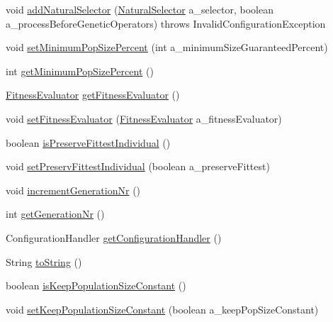 \begin{DoxyCompactItemize}
\item 
void \hyperlink{classorg_1_1jgap_1_1_configuration_af7e58c2226e9c3175f83c26fa7b9dd34}{add\-Natural\-Selector} (\hyperlink{classorg_1_1jgap_1_1_natural_selector}{Natural\-Selector} a\-\_\-selector, boolean a\-\_\-process\-Before\-Genetic\-Operators)  throws Invalid\-Configuration\-Exception 
\item 
void \hyperlink{classorg_1_1jgap_1_1_configuration_ac91bebef1cd9f483ea29f15b8eeadc75}{set\-Minimum\-Pop\-Size\-Percent} (int a\-\_\-minimum\-Size\-Guaranteed\-Percent)
\item 
int \hyperlink{classorg_1_1jgap_1_1_configuration_a7fc5edca890f568ced59ad5faebf3402}{get\-Minimum\-Pop\-Size\-Percent} ()
\item 
\hyperlink{interfaceorg_1_1jgap_1_1_fitness_evaluator}{Fitness\-Evaluator} \hyperlink{classorg_1_1jgap_1_1_configuration_a575de5879241442b607996ceca8bca93}{get\-Fitness\-Evaluator} ()
\item 
void \hyperlink{classorg_1_1jgap_1_1_configuration_a6752c931cd636f3321de9b3d2a6eb740}{set\-Fitness\-Evaluator} (\hyperlink{interfaceorg_1_1jgap_1_1_fitness_evaluator}{Fitness\-Evaluator} a\-\_\-fitness\-Evaluator)
\item 
boolean \hyperlink{classorg_1_1jgap_1_1_configuration_ac97b1abe884c43ca1f1557035d001830}{is\-Preserve\-Fittest\-Individual} ()
\item 
void \hyperlink{classorg_1_1jgap_1_1_configuration_a3246c4d414a78b9dacff0d3554ee7277}{set\-Preserv\-Fittest\-Individual} (boolean a\-\_\-preserve\-Fittest)
\item 
void \hyperlink{classorg_1_1jgap_1_1_configuration_a32e17997b4f406079bb24300d567f123}{increment\-Generation\-Nr} ()
\item 
int \hyperlink{classorg_1_1jgap_1_1_configuration_aa7a80ab3107d1a6a479429409a89fbcc}{get\-Generation\-Nr} ()
\item 
Configuration\-Handler \hyperlink{classorg_1_1jgap_1_1_configuration_a181ca899c0638603daf75256853ebbe2}{get\-Configuration\-Handler} ()
\item 
String \hyperlink{classorg_1_1jgap_1_1_configuration_ae2a41563013d4fafbe90a273f5e55e5b}{to\-String} ()
\item 
boolean \hyperlink{classorg_1_1jgap_1_1_configuration_ad41cca8a908a60f0e4575f02f59b780e}{is\-Keep\-Population\-Size\-Constant} ()
\item 
void \hyperlink{classorg_1_1jgap_1_1_configuration_a3b2630f109f286c5e4dbd91095ab9736}{set\-Keep\-Population\-Size\-Constant} (boolean a\-\_\-keep\-Pop\-Size\-Constant)

\end{DoxyCompactItemize}
